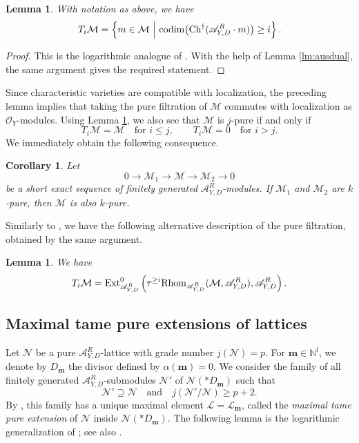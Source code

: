 \documentclass{amsart}
\theoremstyle{plain}
\numberwithin{theorem}{section}
\newtheorem{lemma}[theorem]{Lemma}
\newtheorem{coro}[theorem]{Corollary}
\theoremstyle{definition}
\theoremstyle{remark}
\theoremstyle{definition}
\newcommand{\N}{\mathbb{N}}
\newcommand{\cL}{\mathcal{L}}
\newcommand{\cM}{\mathcal{M}}
\newcommand{\cN}{\mathcal{N}}
\newcommand{\cO}{\mathscr{O}}
\newcommand{\bm}{\mathbf{m}}
\newcommand{\sA}{\mathscr{A}}
\newcommand{\codim}{\textup{codim}}
\newcommand{\Ch}{\textup{Ch}}
\newcommand{\Rhom}{\textup{Rhom}}
\begin{document}
\begin{lemma}\label{lm:purfilcodim}
With notation as above, we have
\[
T_i\cM
=
\left\{
m\in \cM
\ \middle|\
\codim\big(\Ch^\dagger(\sA^R_{Y,D}\cdot m)\big)\ge i
\right\}.
\]
\end{lemma}

\begin{proof}
This is the logarithmic analogue of \cite[Thm.2.19]{Kasbook}. With the help of
Lemma \ref{lm:ausdual}, the same argument gives the required statement.
\end{proof}

Since characteristic varieties are compatible with localization, the preceding
lemma implies that taking the pure filtration of $\cM$ commutes with localization
as $\cO_Y$-modules. Using Lemma \ref{lm:purfilcodim}, we also see that $\cM$ is
$j$-pure if and only if
\[
T_i\cM=\cM \quad \text{for } i\le j,
\qquad
T_i\cM=0 \quad \text{for } i>j.
\]
We immediately obtain the following consequence.

\begin{coro}\label{cor:sesk-pure}
Let
\[
0\to \cM_1\to \cM\to \cM_2\to 0
\]
be a short exact sequence of finitely generated $\sA_{Y,D}^R$-modules. If
$\cM_1$ and $\cM_2$ are $k$-pure, then $\cM$ is also $k$-pure.
\end{coro}

Similarly to \cite[Thm.2.23]{KSbook}, we have the following alternative
description of the pure filtration, obtained by the same argument.

\begin{lemma}\label{lm:dualalPF}
We have
\[
T_i\cM
=
\operatorname{Ext}^{0}_{\sA^R_{Y,D}}
\left(
\tau^{\ge i}
\Rhom_{\sA^R_{Y,D}}(\cM,\sA^R_{Y,D}),
\sA^R_{Y,D}
\right).
\]
\end{lemma}
\subsection{Maximal tame pure extensions of lattices}\label{subsect:mtamepureex}

Let $\cN$ be a pure $\sA_{Y,D}^R$-lattice with grade number $j(\cN)=p$.
For $\bm\in\N^l$, we denote by $D_\bm$ the divisor defined by
$\alpha(\bm)=0$. We consider the family of all finitely generated
$\sA_{Y,D}^R$-submodules $\cN'$ of $\cN(*D_\bm)$ such that
\[
\cN'\supseteq \cN
\quad \text{and} \quad
j(\cN'/\cN)\ge p+2.
\]
By \cite[A.IV 2.10]{BJ}, this family has a unique maximal element
$\cL=\cL_\bm$, called the \emph{maximal tame pure extension} of $\cN$
inside $\cN(*D_\bm)$. The following lemma is the logarithmic generalization
of \cite[Prop.15]{Mai}; see also \cite[Lem.4.4.1]{BVWZ2}.
\end{document}
